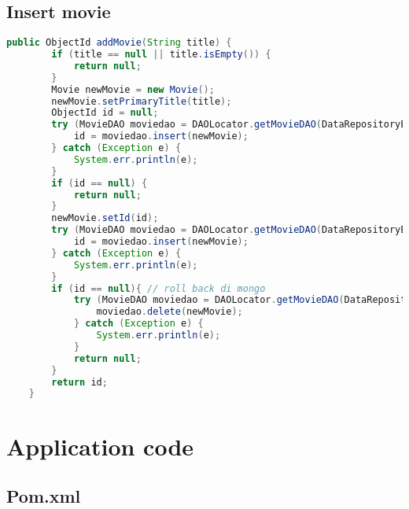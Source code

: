 \begin{alphasection}
\subsection{Insert movie}
\begin{lstlisting}[language=Java]
public ObjectId addMovie(String title) {
        if (title == null || title.isEmpty()) {
            return null;
        }
        Movie newMovie = new Movie();
        newMovie.setPrimaryTitle(title);
        ObjectId id = null;
        try (MovieDAO moviedao = DAOLocator.getMovieDAO(DataRepositoryEnum.MONGO)) {
            id = moviedao.insert(newMovie);
        } catch (Exception e) {
            System.err.println(e);
        }
        if (id == null) {
            return null;
        }
        newMovie.setId(id);
        try (MovieDAO moviedao = DAOLocator.getMovieDAO(DataRepositoryEnum.NEO4j)) {
            id = moviedao.insert(newMovie);
        } catch (Exception e) {
            System.err.println(e);
        }
        if (id == null){ // roll back di mongo
            try (MovieDAO moviedao = DAOLocator.getMovieDAO(DataRepositoryEnum.MONGO)) {
                moviedao.delete(newMovie);
            } catch (Exception e) {
                System.err.println(e);
            }
            return null;
        }
        return id;
    }
\end{lstlisting}

\section{Application code}
\subsection{Pom.xml}\label{subsec:pom}


\end{alphasection}
%
